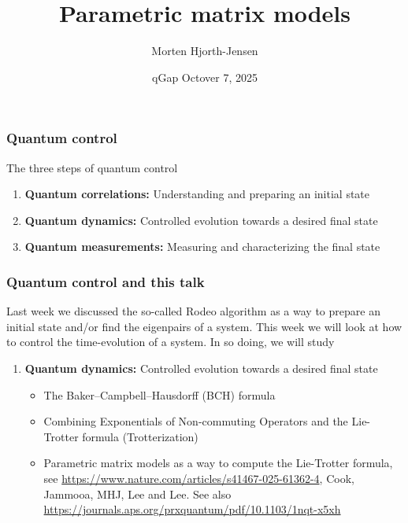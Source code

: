 \documentclass{beamer}
\begin{document}
\begin{frame}
\title[Quantum Computing and ML]{\textbf{Parametric matrix models}}
\author{Morten Hjorth-Jensen}
\date{qGap Octover 7, 2025}
\titlepage
\end{frame}



\begin{frame}
\frametitle{Quantum control}

\begin{block}{The three steps of quantum control}
\begin{enumerate}
\item {\bf Quantum correlations:} Understanding and preparing an initial state
\item {\bf Quantum dynamics:} Controlled evolution towards a desired final state
\item {\bf Quantum measurements:} Measuring and characterizing the final state
\end{enumerate}


\end{block}

\end{frame}

\begin{frame}
\frametitle{Quantum control and this talk}

Last week we discussed the so-called Rodeo algorithm as a way to
prepare an initial state and/or find the eigenpairs of a system. This
week we will look at how to control the time-evolution of a system. In
so doing, we will study
\begin{block}{}
\begin{enumerate}
\item {\bf Quantum dynamics:} Controlled evolution towards a desired final state
  \begin{itemize}
  \item The Baker–Campbell–Hausdorff (BCH) formula
  \item Combining Exponentials of Non-commuting Operators and the Lie-Trotter formula (Trotterization)
  \item Parametric matrix models as a way to compute the Lie-Trotter formula, see \url{https://www.nature.com/articles/s41467-025-61362-4}, Cook, Jammooa, MHJ, Lee and Lee. See also \url{https://journals.aps.org/prxquantum/pdf/10.1103/1nqt-x5xh}
  \end{itemize}  
\end{enumerate}
\end{block}
\end{frame}
\end{document}
